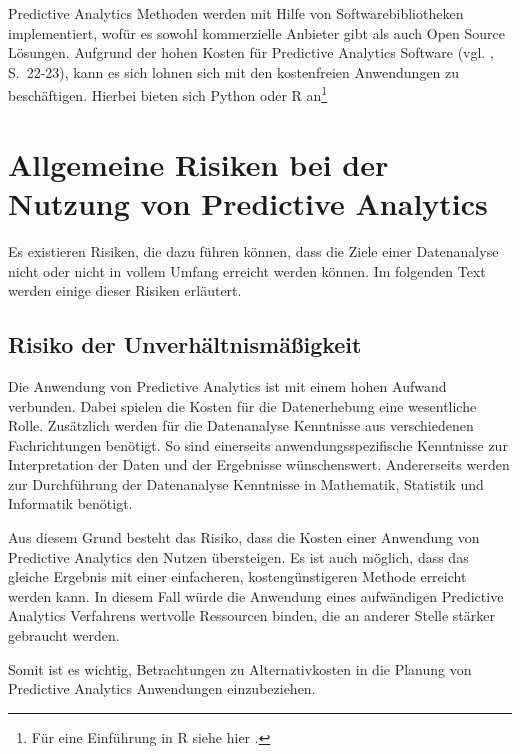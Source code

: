 Predictive Analytics Methoden werden mit Hilfe von Softwarebibliotheken implementiert, wofür es sowohl kommerzielle Anbieter
gibt als auch Open Source Lösungen. Aufgrund der hohen Kosten für Predictive Analytics Software (vgl. \cite{Iffert}, S.~22-23), 
kann es sich lohnen sich mit den kostenfreien Anwendungen zu beschäftigen. Hierbei bieten sich Python oder R an\footnote{
Für eine Einführung in R siehe hier \cite{Intro_R}.
}


\section{Allgemeine Risiken bei der Nutzung von Predictive Analytics}

Es existieren Risiken, die dazu führen können, dass die Ziele einer
Datenanalyse nicht oder nicht in vollem Umfang erreicht werden können.
Im folgenden Text werden einige dieser Risiken erläutert.

\subsection{Risiko der Unverhältnismäßigkeit}

Die Anwendung von Predictive Analytics ist mit einem hohen Aufwand verbunden.
Dabei spielen die Kosten für die Datenerhebung eine wesentliche Rolle.
Zusätzlich werden für die Datenanalyse Kenntnisse aus verschiedenen
Fachrichtungen benötigt. So sind einerseits anwendungsspezifische Kenntnisse
zur Interpretation der Daten und der Ergebnisse wünschenswert. Andererseits
werden zur Durchführung der Datenanalyse Kenntnisse in Mathematik, Statistik und
Informatik benötigt.

Aus diesem Grund besteht das Risiko, dass die Kosten einer Anwendung von
Predictive Analytics den Nutzen übersteigen. Es ist auch möglich, dass das
gleiche Ergebnis mit einer einfacheren, kostengünstigeren Methode erreicht
werden kann. In diesem Fall würde die Anwendung eines aufwändigen Predictive
Analytics Verfahrens wertvolle Ressourcen binden, die an anderer Stelle stärker
gebraucht werden. 

Somit ist es wichtig, Betrachtungen zu Alternativkosten
in die Planung von Predictive Analytics Anwendungen einzubeziehen. 



